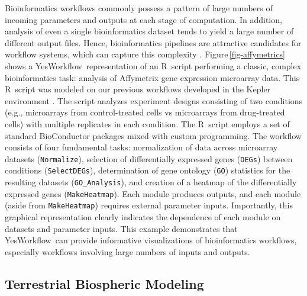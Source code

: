 \documentclass{article}
\newcommand{\YW}{\textsf{YesWorkflow}}
\newcommand{\ywm}[1]{\texttt{#1}}
\newcommand{\R}{\textsf{R}}
\newcommand{\figref}[1]{Figure\,\ref{#1}}
\begin{document}
 Bioinformatics workflows commonly possess a pattern of large numbers
 of incoming parameters and outputs at each stage of computation. In
 addition, analysis of even a single bioinformatics dataset tends to
 yield a large number of different output files. Hence, bioinformatics
 pipelines are attractive candidates for workflow systems, which can
 capture this complexity \cite{bieda2012kepler}. \figref{fig-affymetrics}
 shows a \YW\ representation of an \R\ script performing a
 classic, complex bioinformatics task: analysis of Affymetrix gene
 expression microarray data. This \R\ script was modeled on our previous
 workflows developed in the Kepler environment \cite{stropp2012workflows}.
 The script analyzes experiment designs consisting of two conditions
 (e.g., microarrays from control-treated cells vs microarrays from
 drug-treated cells) with multiple replicates in each condition. The
 \R\ script employs a set of standard BioConductor
 \cite{gentleman2004bioconductor} packages mixed with custom programming. The
 workflow consists of four fundamental tasks: normalization of data
 across microarray datasets (\ywm{Normalize}), selection of
 differentially expressed genes (\ywm{DEGs}) between conditions
 (\ywm{SelectDEGs}), determination of gene ontology (\ywm{GO})
 statistics for the resulting datasets (\ywm{GO\_Analysis}), and
 creation of a heatmap of the differentially expressed genes
 (\ywm{MakeHeatmap}). Each module produces outputs, and each module
 (aside from \ywm{MakeHeatmap}) requires external parameter
 inputs. Importantly, this graphical representation clearly indicates
 the dependence of each module on datasets and parameter inputs. This
 example demonstrates that \YW\ can provide informative visualizations
 of bioinformatics workflows, especially workflows involving large
 numbers of inputs and outputs.




\subsection{Terrestrial Biospheric Modeling}\label{sec-MsTMIP}
\end{document}
